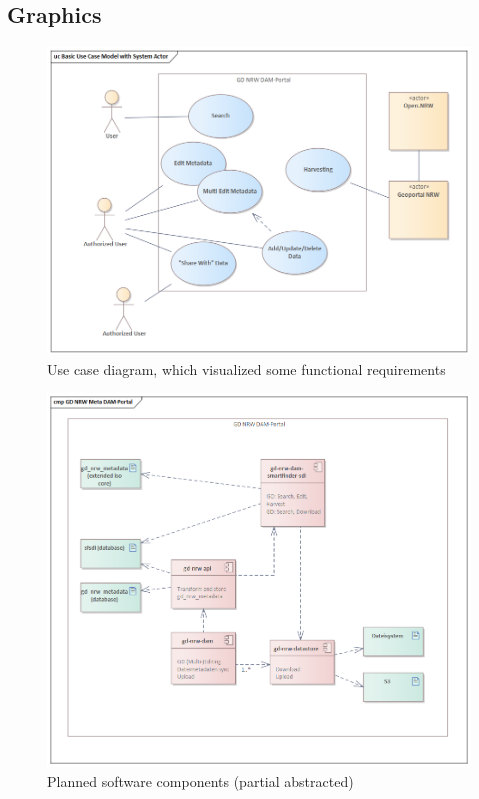 \documentclass[11pt, titlepage, a4paper]{article}
\begin{document}
\begin{appendices}
    \section{Graphics}
    \begin{figure}[H]
        \caption{Use case diagram, which visualized some functional requirements}
        \label{fig:usecase}
        \includegraphics[width=16cm]{usecase_diagramm.png}
        \centering
    \end{figure}
    \begin{figure}[H]
        \caption{Planned software components (partial abstracted)}
        \label{fig:components}
        \includegraphics[width=16cm]{components.png}
        \centering
    \end{figure}


\end{appendices}
\end{document}
